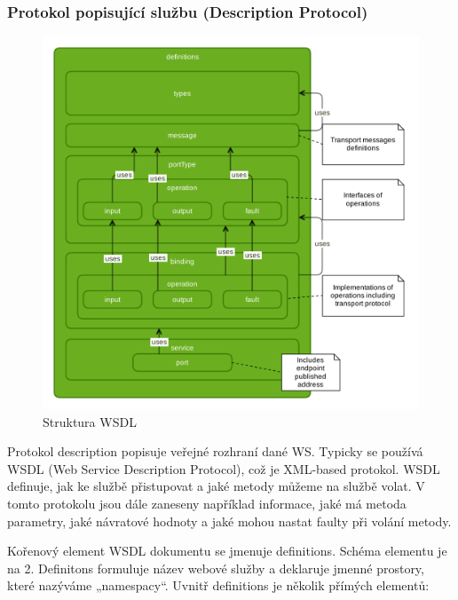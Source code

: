 \documentclass[11pt,twoside,a4paper]{book}
\begin{document}
\subsubsection{Protokol popisující službu (Description Protocol)}

\begin{figure}[h]
\begin{center}
\includegraphics[width=12cm]{images-pdf/wsdl.pdf} 
\caption{Struktura WSDL}
\label{fig:logo}
\end{center}
\end{figure}

Protokol description popisuje veřejné rozhraní dané WS. Typicky se používá WSDL (Web
Service Description Protocol), což je XML-based protokol. WSDL definuje, jak ke službě
přistupovat a jaké metody můžeme na službě volat. V tomto protokolu jsou dále zaneseny
například informace, jaké má metoda parametry, jaké návratové hodnoty a jaké mohou nastat
faulty při volání metody.

Kořenový element WSDL dokumentu se jmenuje definitions. Schéma elementu je na 2.
Definitons formuluje název webové služby a deklaruje jmenné prostory, které nazýváme
„namespacy“. Uvnitř definitions je několik přímých elementů:
\end{document}
